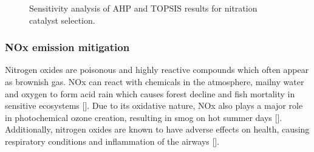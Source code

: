 \begin{figure}[h]
    \centering
    \qquad
    \caption{Sensitivity analysis of AHP and TOPSIS results for nitration catalyst selection.}%
    \label{fig:catalyst}%
\end{figure}

\subsubsection{NOx emission mitigation}

Nitrogen oxides are poisonous and highly reactive compounds which often appear as brownish gas. NOx can react with chemicals in the atmosphere, mailny water and oxygen to form acid rain which causes forest decline and fish mortality in sensitive ecosystems []. Due to its oxidative nature, NOx also plays a major role in photochemical ozone creation, resulting in smog on hot summer days []. Additionally, nitrogen oxides are known to have adverse effects on  health, causing respiratory conditions and  inflammation of the airways []. 

